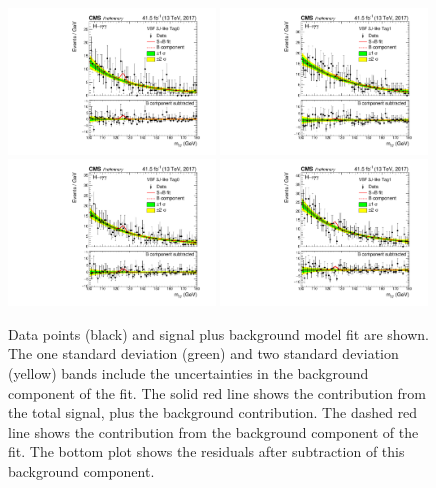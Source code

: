 \begin{figure}[hptb]
  \centering
  \includegraphics[width=0.49\textwidth]{Figures/Appendices/_forAppendix2017ch2_RECO_VBFTOPO_JET3VETO_Tag0_13TeV.pdf}
  \includegraphics[width=0.49\textwidth]{Figures/Appendices/_forAppendix2017ch2_RECO_VBFTOPO_JET3VETO_Tag1_13TeV.pdf}
  \includegraphics[width=0.49\textwidth]{Figures/Appendices/_forAppendix2017ch2_RECO_VBFTOPO_JET3_Tag0_13TeV.pdf}
  \includegraphics[width=0.49\textwidth]{Figures/Appendices/_forAppendix2017ch2_RECO_VBFTOPO_JET3_Tag1_13TeV.pdf}
  \caption[Signal plus background fits to data.]
  {
    Data points (black) and signal plus background model fit are shown. 
    The one standard deviation (green) and two standard deviation (yellow) bands 
    include the uncertainties in the background component of the fit. 
    The solid red line shows the contribution from the total signal, plus the background contribution. 
    The dashed red line shows the contribution from the background component of the fit. 
    The bottom plot shows the residuals after subtraction of this background component.
  }
\end{figure}

